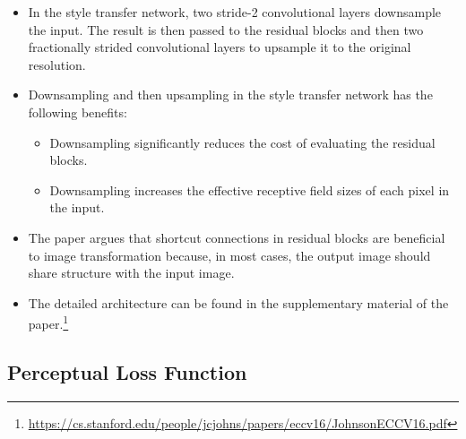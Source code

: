 \documentclass[10pt]{article}
\begin{document}
\begin{itemize}
    \item In the style transfer network, two stride-2 convolutional layers downsample the input. The result is then passed to the residual blocks and then two fractionally strided convolutional layers to upsample it to the original resolution.

    \item Downsampling and then upsampling in the style transfer network has the following benefits:
    \begin{itemize}
      \item Downsampling significantly reduces the cost of evaluating the residual blocks.
      \item Downsampling increases the effective receptive field sizes of each pixel in the input.
    \end{itemize}

    \item The paper argues that shortcut connections in residual blocks are beneficial to image transformation because, in most cases, the output image should share structure with the input image.

    \item The detailed architecture can be found in the supplementary material of the paper.\footnote{\url{https://cs.stanford.edu/people/jcjohns/papers/eccv16/JohnsonECCV16.pdf}}

  \end{itemize}

  \subsection{Perceptual Loss Function}
\end{document}

